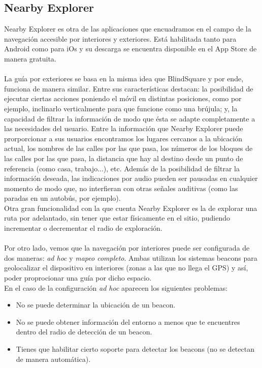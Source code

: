 \documentclass{article}
\begin{document}
	\subsection{Nearby Explorer}
	Nearby Explorer es otra de las aplicaciones que encuadramos en el campo de la navegación accesible por interiores y exteriores. Está habilitada tanto para Android como para iOs y su descarga se encuentra disponible en el App Store de manera gratuita. 
	\\
	\\
	La guía por exteriores se basa en la misma idea que BlindSquare y por ende, funciona de manera similar. Entre sus características destacan: la posibilidad de ejecutar ciertas acciones poniendo el móvil en distintas posiciones, como por ejemplo, inclinarlo verticalmente para que funcione como una brújula; y, la capacidad de filtrar la información de modo que ésta se adapte completamente a las necesidades del usuario. Entre la información que Nearby Explorer puede prorporcionar a sus usuarios encontramos los lugares cercanos a la ubicación actual, los nombres de las calles por las que pasa, los números de los bloques de las calles por las que pasa, la distancia que hay al destino desde un punto de referencia (como casa, trabajo...), etc. 
	Además de la posibilidad de filtrar la información deseada, las indicaciones por audio pueden ser pausadas en cualquier momento de modo que, no interfieran con otras señales auditivas (como las paradas en un autobús, por ejemplo). 
	\\
	Otra gran funcionalidad con la que cuenta Nearby Explorer es la de explorar una ruta por adelantado, sin tener que estar físicamente en el sitio, pudiendo incrementar o decrementar el radio de exploración.
	\\
	\\
	Por otro lado, vemos que la navegación por interiores puede ser configurada de dos maneras: \textit{ad hoc} y \textit{mapeo completo}. Ambas utilizan los sistemas beacons para geolocalizar el dispositivo en interiores (zonas a las que no llega el GPS) y así, poder proprocionar una guía por dicho espacio.
	\\
	En el caso de la configuración \textit{ad hoc} aparecen los siguientes problemas:
	\begin{itemize}
		\item No se puede determinar la ubicación de un beacon. 
		\item No se puede obtener información del entorno a menos que te encuentres dentro del radio de detección de un beacon.
		\item Tienes que habilitar cierto soporte para detectar los beacons (no se detectan de manera automática).
	\end{itemize}
\end{document}
